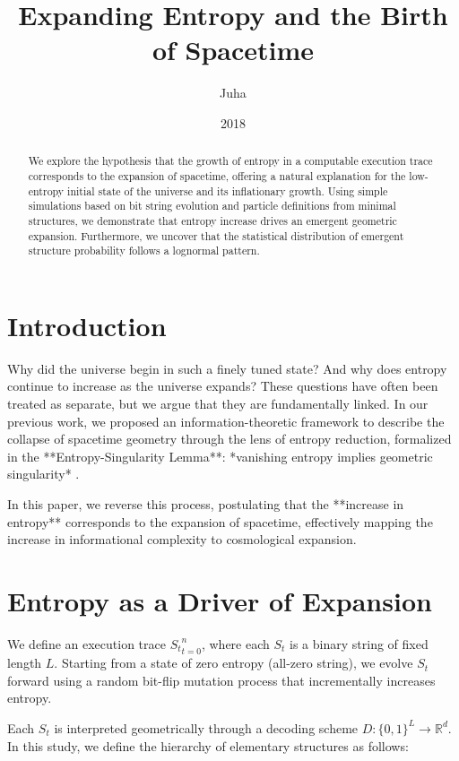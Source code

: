 \documentclass[11pt]{article}
\title{Expanding Entropy and the Birth of Spacetime}
\author{Juha}
\date{2018}
\begin{document}
\maketitle


\begin{abstract}
   We explore the hypothesis that the growth of entropy in a computable execution trace corresponds to the expansion of spacetime,
   offering a natural explanation for the low-entropy initial state of the universe and its inflationary growth. Using simple simulations
   based on bit string evolution and particle definitions from minimal structures, we demonstrate that entropy
   increase drives an emergent geometric expansion. Furthermore, we uncover that the statistical distribution of emergent
   structure probability follows a lognormal pattern.
\end{abstract}

\section{Introduction}

Why did the universe begin in such a finely tuned state? And why does entropy continue to increase as the universe expands?
These questions have often been treated as separate, but we argue that they are fundamentally linked.
In our previous work, we proposed an information-theoretic framework to describe the collapse of spacetime geometry through
the lens of entropy reduction, formalized in the **Entropy-Singularity Lemma**: *vanishing entropy implies geometric
singularity* \cite{Paper1}.

In this paper, we reverse this process, postulating that the **increase in entropy** corresponds to the expansion of spacetime,
effectively mapping the increase in informational complexity to cosmological expansion.


\section{Entropy as a Driver of Expansion}

We define an execution trace ${S_t}_{t=0}^n$, where each $S_t$ is a binary string of fixed length $L$.
Starting from a state of zero entropy (all-zero string), we evolve $S_t$ forward using a random bit-flip mutation process that
incrementally increases entropy.

Each $S_t$ is interpreted geometrically through a decoding scheme $D: \{0,1\}^L \to \mathbb{R}^d$. In this study,
we define the hierarchy of elementary structures as follows:
\end{document}
